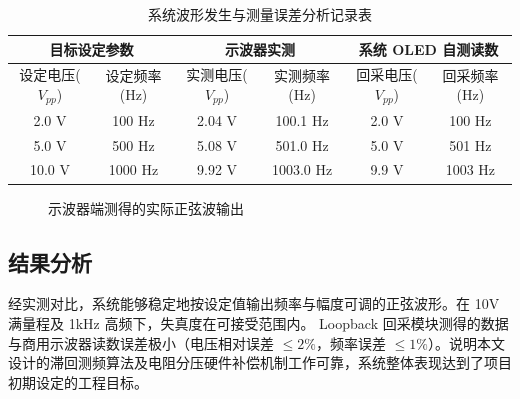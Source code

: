 \documentclass[a4paper,12pt]{ctexart}
\begin{document}
\begin{table}[H]
    \centering
    \caption{系统波形发生与测量误差分析记录表}
    \begin{tabular}{cc|cc|cc}
        \toprule
        \multicolumn{2}{c|}{\textbf{目标设定参数}} & \multicolumn{2}{c|}{\textbf{示波器实测}} & \multicolumn{2}{c}{\textbf{系统 OLED 自测读数}} \\
        \midrule
        设定电压($V_{pp}$) & 设定频率(Hz) & 实测电压($V_{pp}$) & 实测频率(Hz) & 回采电压($V_{pp}$) & 回采频率(Hz) \\
        \midrule
        2.0 V  & 100 Hz  & 2.04 V  & 100.1 Hz & 2.0 V  & 100 Hz \\
        5.0 V  & 500 Hz  & 5.08 V  & 501.0 Hz & 5.0 V  & 501 Hz \\
        10.0 V & 1000 Hz & 9.92 V  & 1003.0 Hz & 9.9 V & 1003 Hz \\
        \bottomrule
    \end{tabular}
\end{table}

\begin{figure}[H]
    \centering
    \vspace{4.5cm} %
    \caption{示波器端测得的实际正弦波输出}
\end{figure}

\subsection{结果分析}
经实测对比，系统能够稳定地按设定值输出频率与幅度可调的正弦波形。在 10V 满量程及 1kHz 高频下，失真度在可接受范围内。
Loopback 回采模块测得的数据与商用示波器读数误差极小（电压相对误差 $\le 2\%$，频率误差 $\le 1\%$）。说明本文设计的滞回测频算法及电阻分压硬件补偿机制工作可靠，系统整体表现达到了项目初期设定的工程目标。
\end{document}
